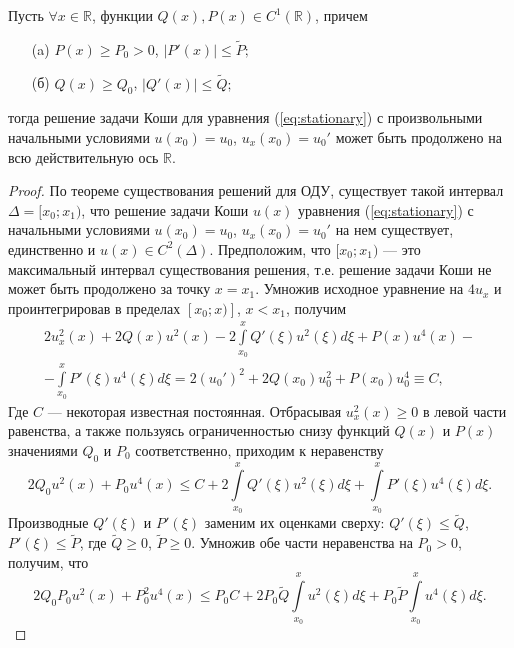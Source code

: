 \begin{proposition}
Пусть $\forall x \in \mathbb{R}$, функции $Q(x), P(x) \in C^1(\mathbb{R})$, причем
%
\begin{itemize}
\item[(a)] $P(x) \ge P_0 > 0$, $|P'(x)| \le \widetilde{P};$
\item[(б)] $Q(x) \ge Q_0$, $|Q'(x)| \le \widetilde{Q};$
\end{itemize}
%
тогда решение задачи Коши для уравнения (\ref{eq:stationary}) с произвольными начальными условиями $u(x_0) = u_0$, $u_x(x_0) = u_0'$ может быть продолжено на всю действительную ось $\mathbb{R}$.
\label{prop:continuation}
\end{proposition}
%
\begin{proof}
По теореме существования решений для ОДУ, существует такой интервал $\Delta = [x_0; x_1)$, что решение задачи Коши $u(x)$ уравнения (\ref{eq:stationary}) с начальными условиями $u(x_0) = u_0$, $u_x(x_0) = u_0'$ на нем существует, единственно и $u(x) \in C^2(\Delta)$.
Предположим, что $[x_0; x_1)$ --- это максимальный интервал существования решения, т.е. решение задачи Коши не может быть продолжено за точку $x = x_1$.
Умножив исходное уравнение на $4u_x$ и проинтегрировав в пределах $[x_0; x)]$, $x < x_1$, получим
%
\begin{eqnarray}
2u_{x}^2(x) + 2Q(x)u^2(x) - 2{\int \limits_{x_0}^x Q'(\xi)u^2(\xi)d\xi} + P(x)u^4(x) - \\
\nonumber - {\int \limits_{x_0}^x P'(\xi)u^4(\xi)d\xi} = 2(u_0')^2 + 2Q(x_0)u_0^2 + P(x_0)u_0^4 \equiv C,\label{eq:integrated}
\end{eqnarray}
%
Где $C$ --- некоторая известная постоянная.
Отбрасывая $u_x^2(x) \ge 0$ в левой части равенства, а также пользуясь ограниченностью снизу функций $Q(x)$ и $P(x)$ значениями $Q_0$ и $P_0$ соответственно, приходим к неравенству
%
\begin{equation}
2Q_0 u^2(x) + P_0 u^4(x) \le C + 2{\int \limits_{x_0}^x
Q'(\xi)u^2(\xi)d\xi} + {\int \limits_{x_0}^x P'(\xi)u^4(\xi)d\xi}.
\label{eq:bound}
\end{equation}
%
Производные $Q'(\xi)$ и $P'(\xi)$ заменим их оценками сверху: $Q'(\xi) \le \widetilde{Q}$, $P'(\xi) \le \widetilde{P}$, где $\widetilde{Q} \ge 0$, $\widetilde{P} \ge 0$.
Умножив обе части неравенства на $P_0 > 0$, получим, что
%
\begin{equation}
2Q_0 P_0 u^2(x) + P_0^2 u^4(x) \le P_0 C + 2P_0 \widetilde{Q}{\int\limits_{x_0}^x u^2(\xi)d\xi} + P_0 \widetilde{P}{\int \limits_{x_0}^x u^4(\xi)d\xi}.
\end{equation}

\end{proof}

